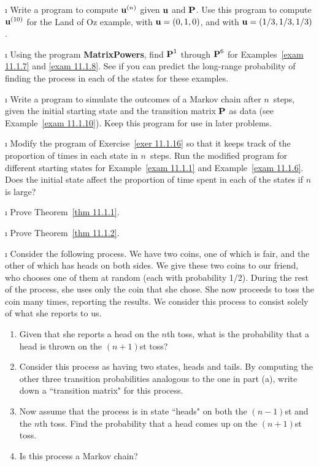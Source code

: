 \begin{LJSItem}
\i\label{exer 11.1.14} Write a program to compute ${\mbox{\bf u}\/}^{(n)}$ given ${\mbox{\bf u}\/}$ and 
${\mbox{\bf P}\/}$.  Use this program to compute ${\mbox{\bf u}\/}^{(10)}$ for the Land of Oz
example, with 
${\mbox{\bf u}\/} = (0, 1, 0)$, and with ${\mbox{\bf u}\/} = (1/3, 1/3, 1/3)$.

\i\label{exer 11.1.15} Using the program {\bf  MatrixPowers}, find ${\mbox{\bf P}\/}^1$
through 
${\mbox{\bf P}\/}^6$ for Examples~\ref{exam 11.1.7} and \ref{exam 11.1.8}.  See if you
can 
predict the long-range probability of finding the process in each of the states
for 
these examples.

\i\label{exer 11.1.16} Write a program to simulate the outcomes of a Markov
chain after $n$~steps, given the initial starting state and the transition
matrix ${\mbox{\bf P}\/}$ as data (see Example~\ref{exam 11.1.10}).  Keep this program
for use in
later problems.

\i\label{exer 11.1.17} Modify the program of Exercise~\ref{exer 11.1.16} so
that it 
keeps track of the proportion of times in each state in $n$~steps.  Run the
modified
program for different starting states for Example~\ref{exam 11.1.1} and 
Example~\ref{exam 11.1.6}.  Does the initial state affect the proportion of
time 
spent in each of the states if $n$ is large?

\i\label{exer 11.1.18} Prove Theorem~\ref{thm 11.1.1}.

\i\label{exer 11.1.19} Prove Theorem~\ref{thm 11.1.2}.

\i\label{exer 11.1.20} Consider the following process.  We have two coins, one
of which
is fair, and the other of which has heads on both sides.   We give these two
coins to
our friend, who chooses one of them at random (each with probability 1/2). 
During the
rest of the process, she uses only the coin that she chose.  She now proceeds
to toss
the coin many times, reporting the results.  We consider this process to
consist solely of
what she reports to us.
\begin{enumerate}
\item Given that she reports a head on the $n$th toss, what is the probability
that
a head is thrown on the $(n+1)$st toss?

\item Consider this process as having two states, heads and tails.  By
computing the
other three transition probabilities analogous to the one in part (a), write
down a 
``transition matrix" for this process.

\item Now assume that the process is in state ``heads" on both the $(n-1)$st
and the
$n$th toss.  Find the probability that a head comes up on the $(n+1)$st toss.

\item Is this process a Markov chain?
\end{enumerate}

\end{LJSItem}

